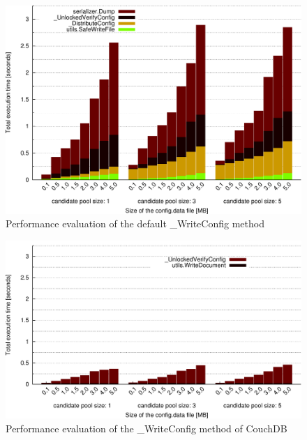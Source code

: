 \begin{figure}[htbp]
  \begin{center}
    \includegraphics[width=1.0\maxwidth]{../figures/total-cfg.pdf}
    \caption{Performance evaluation of the default \_WriteConfig method}
    \label{fig:total-cfg}
  \end{center}
\end{figure}

\begin{figure}[htbp]
  \begin{center}
    \includegraphics[width=1.0\maxwidth]{../figures/couchdb.pdf}
    \caption{Performance evaluation of the \_WriteConfig method of CouchDB}
    \label{fig:couchdb}
  \end{center}
\end{figure}

